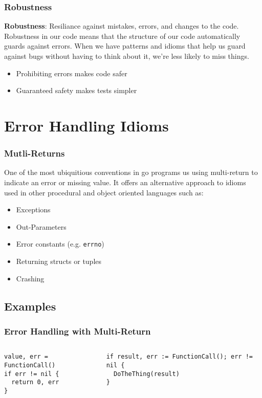 \documentclass{beamer}
\begin{document}
\begin{frame}
  \frametitle{Robustness}
  {\bf Robustness}: Resiliance against mistakes, errors, and changes to the code.
  \vfill
  Robustness in our code means that the structure of our code
  automatically guards against errors.  When we have patterns and
  idioms that help us guard against bugs without having to think about
  it, we're less likely to miss things.
  \vfill
  \begin{itemize}
    \item Prohibiting errors makes code safer
    \item Guaranteed safety makes tests simpler
  \end{itemize}
\end{frame}

\section{Error Handling Idioms}

\begin{frame}[fragile]
  \frametitle{Mutli-Returns}
  One of the most ubiquitious conventions in go programs us using
  multi-return to indicate an error or missing value.  It offers an
  alternative approach to idioms used in other procedural and object
  oriented languages such as:
  \vfill
  \begin{itemize}
  \item Exceptions
  \item Out-Parameters
  \item Error constants (e.g. \verb!errno!)
  \item Returning structs or tuples
  \item Crashing
  \end{itemize}
\end{frame}

\subsection{Examples}
\begin{frame}[fragile]
  \frametitle{Error Handling with Multi-Return}
  \begin{columns}[T]
    \begin{column}{.48\textwidth}
\begin{lstlisting}
value, err = FunctionCall()
if err != nil {
  return 0, err
}
\end{lstlisting}
    \end{column}
    \hfill%
    \begin{column}{.48\textwidth}
\begin{lstlisting}
if result, err := FunctionCall(); err != nil {
  DoTheThing(result)
}
\end{lstlisting}
    \end{column}
  \end{columns}
\end{frame}
\end{document}
